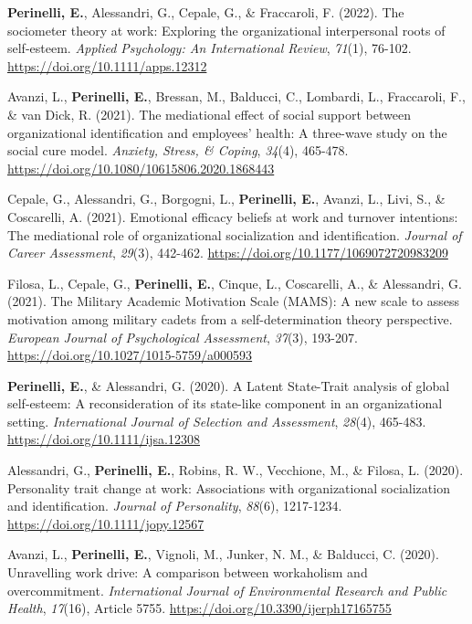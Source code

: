 \documentclass[hidelinks, letterpaper,10pt]{article} %
\begin{document}
\begin{etaremune}
\item \textbf{Perinelli, E.}, Alessandri, G., Cepale, G., \& Fraccaroli, F. (2022). The sociometer theory at work: Exploring the organizational interpersonal roots of self-esteem. \textit{Applied Psychology: An International Review}, \textit{71}(1), 76-102. \url{https://doi.org/10.1111/apps.12312}

\item Avanzi, L., \textbf{Perinelli, E.}, Bressan, M., Balducci, C., Lombardi, L., Fraccaroli, F., \& van Dick, R. (2021). The mediational effect of social support between organizational identification and employees’ health: A three-wave study on the social cure model. \textit{Anxiety, Stress, \& Coping}, \textit{34}(4), 465-478. \url{https://doi.org/10.1080/10615806.2020.1868443} 

\item Cepale, G., Alessandri, G., Borgogni, L., \textbf{Perinelli, E.}, Avanzi, L., Livi, S., \& Coscarelli, A. (2021). Emotional efficacy beliefs at work and turnover intentions: The mediational role of organizational socialization and identification. \textit{Journal of Career Assessment}, \textit{29}(3), 442-462. \url{https://doi.org/10.1177/1069072720983209} 

\item Filosa, L., Cepale, G.,\textbf{ Perinelli, E.}, Cinque, L., Coscarelli, A., \& Alessandri, G. (2021). The Military Academic Motivation Scale (MAMS): A new scale to assess motivation among military cadets from a self-determination theory perspective.\textit{ European Journal of Psychological Assessment}, \textit{37}(3), 193-207. \url{https://doi.org/10.1027/1015-5759/a000593} 

\item \textbf{Perinelli, E.}, \& Alessandri, G. (2020). A Latent State-Trait analysis of global self-esteem: A reconsideration of its state-like component in an organizational setting. \textit{International Journal of Selection and Assessment}, \textit{28}(4), 465-483. \url{https://doi.org/10.1111/ijsa.12308}

\item Alessandri, G., \textbf{Perinelli, E.}, Robins, R. W., Vecchione, M., \& Filosa, L. (2020). Personality trait change at work: Associations with organizational socialization and identification. \textit{Journal of Personality}, \textit{88}(6), 1217-1234. \url{https://doi.org/10.1111/jopy.12567} 

\item Avanzi, L., \textbf{Perinelli, E.}, Vignoli, M., Junker, N. M., \& Balducci, C. (2020). Unravelling work drive: A comparison between workaholism and overcommitment.\textit{ International Journal of Environmental Research and Public Health}, \textit{17}(16), Article 5755. \url{https://doi.org/10.3390/ijerph17165755}


\end{etaremune}
\end{document}
